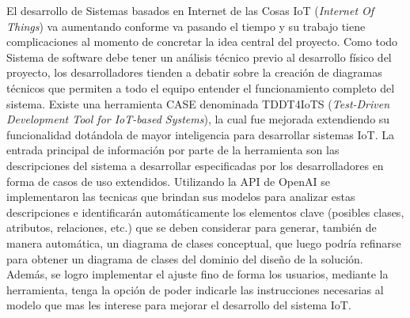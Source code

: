 
El desarrollo de Sistemas basados en Internet de las Cosas IoT (\textit{Internet Of Things}) va aumentando conforme va pasando el tiempo y su trabajo tiene complicaciones al momento de concretar la idea central del proyecto. Como todo Sistema de software debe tener un análisis técnico previo al desarrollo físico del proyecto, los desarrolladores tienden a debatir sobre la creación de diagramas técnicos que permiten a todo el equipo entender el funcionamiento completo del sistema. Existe una herramienta CASE denominada TDDT4IoTS (\textit{Test-Driven Development Tool for IoT-based Systems}), la cual fue mejorada extendiendo su funcionalidad dotándola de mayor inteligencia para desarrollar sistemas IoT. La entrada principal de información por parte de la herramienta son las descripciones del sistema a desarrollar especificadas por los desarrolladores en forma de casos de uso extendidos. Utilizando la API de OpenAI se implementaron las tecnicas que brindan sus modelos para analizar estas descripciones e identificarán automáticamente los elementos clave (posibles clases, atributos, relaciones, etc.) que se deben considerar para generar, también de manera automática, un diagrama de clases conceptual, que luego podría refinarse para obtener un diagrama de clases del dominio del diseño de la solución. Además, se logro implementar el ajuste fino de forma los usuarios, mediante la herramienta, tenga la opción de poder indicarle las instrucciones necesarias al modelo que mas les interese para mejorar el desarrollo del sistema IoT.